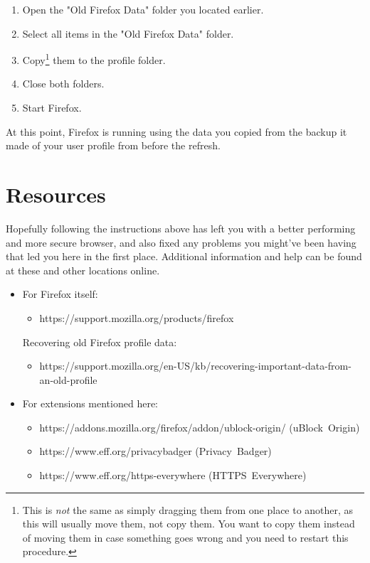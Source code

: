 \documentclass{tufte-handout}
\begin{document}
\begin{enumerate}
	\item Open the "Old Firefox Data" folder you located earlier.
	\item Select all items in the "Old Firefox Data" folder.
	\item Copy\footnote{This is \emph{not} the same as simply dragging them from one place to another, as this will usually move them, not copy them.  You want to copy them instead of moving them in case something goes wrong and you need to restart this procedure.} them to the profile folder.
	\item Close both folders.
	\item Start Firefox.
\end{enumerate}

At this point, Firefox is running using the data you copied from the backup it made of your user profile from before the refresh.



\section{Resources}
Hopefully following the instructions above has left you with a better performing and more secure browser, and also fixed any problems you might've been having that led you here in the first place.  Additional information and help can be found at these and other locations online.
\begin{itemize}
	\item For Firefox itself:
	\begin{itemize}
		\item[] https://support.mozilla.org/products/firefox
	\end{itemize}
	Recovering old Firefox profile data:
	\begin{itemize}
		\item[] https://support.mozilla.org/en-US/kb/recovering-important-data-from-an-old-profile
	\end{itemize}
	\item For extensions mentioned here:
	\begin{itemize}
		\item https://addons.mozilla.org/firefox/addon/ublock-origin/ (\mbox{uBlock Origin})
		\item https://www.eff.org/privacybadger (\mbox{Privacy Badger})
		\item https://www.eff.org/https-everywhere (\mbox{HTTPS Everywhere})
	\end{itemize}
\end{itemize}

\end{document}

